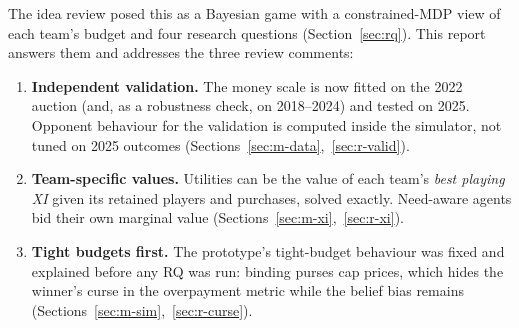 \documentclass{article}
\newcommand{\1}{\mathbb{1}}
\begin{document}
The idea review posed this as a Bayesian game with a constrained-MDP view of each team's budget and four research questions (Section~\ref{sec:rq}). This report answers them and addresses the three review comments:
\begin{enumerate}
  \item \textbf{Independent validation.} The money scale is now fitted on the 2022 auction (and, as a robustness check, on 2018--2024) and tested on 2025. Opponent behaviour for the validation is computed inside the simulator, not tuned on 2025 outcomes (Sections~\ref{sec:m-data},~\ref{sec:r-valid}).
  \item \textbf{Team-specific values.} Utilities can be the value of each team's \emph{best playing XI} given its retained players and purchases, solved exactly. Need-aware agents bid their own marginal value (Sections~\ref{sec:m-xi},~\ref{sec:r-xi}).
  \item \textbf{Tight budgets first.} The prototype's tight-budget behaviour was fixed and explained before any RQ was run: binding purses cap prices, which hides the winner's curse in the overpayment metric while the belief bias remains (Sections~\ref{sec:m-sim},~\ref{sec:r-curse}).
\end{enumerate}

\end{document}
